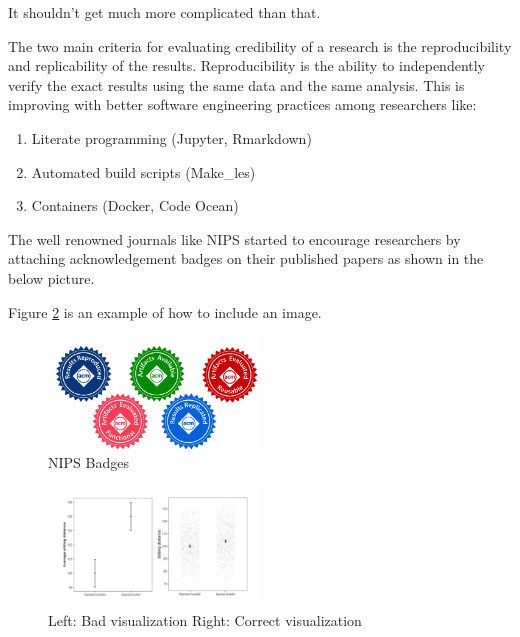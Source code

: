 It shouldn't get much more complicated than that.


The two main criteria for evaluating credibility of a research is the reproducibility and replicability of the results. Reproducibility is the ability to independently verify the exact results using the same data and the same analysis. 
This is improving with better software engineering practices among researchers like:
\begin{enumerate}
  \item Literate programming (Jupyter, Rmarkdown)
  \item Automated build scripts (Make_les)
  \item Containers (Docker, Code Ocean)
\end{enumerate}




The well renowned journals like NIPS started to encourage researchers by attaching acknowledgement badges on their published papers as shown in the below picture. 

Figure \ref{fig:badges} is an example of how to include an image.

\begin{figure}[ht]
  \begin{center}
    \includegraphics[width=0.5\textwidth]{figures/badges.png}
    \caption{
    NIPS Badges
      }
    \label{fig:badges}
  \end{center}
\end{figure}
















 \begin{figure}[ht]
  \begin{center}
    \includegraphics[width=0.5\textwidth]{figures/quiz3.png}
    \caption{
    Left: Bad visualization Right: Correct visualization
      }
    \label{fig:badges}
  \end{center}
\end{figure}
 
 